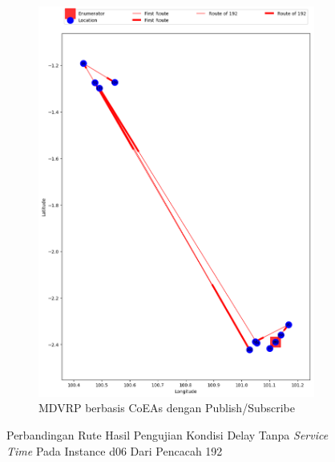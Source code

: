 \begin{figure}[H]\ContinuedFloat
	\centering
	\begin{subfigure}[t]{\textwidth}
		\centering
		\includegraphics[width=\textwidth]{Resources/Images/delayed_6/real_m15_n100_delayed_6_192_pubsub_coes}
		\caption{MDVRP berbasis CoEAs dengan Publish/Subscribe}
		\label{fig:real_m15_n100_delayed_6_192_pubsub_coes}
	\end{subfigure}
	\caption{Perbandingan Rute Hasil Pengujian Kondisi Delay Tanpa \textit{Service Time} Pada Instance d06 Dari Pencacah 192}
	\label{fig:real_m15_n100_delayed_6_192_contd}
\end{figure}



